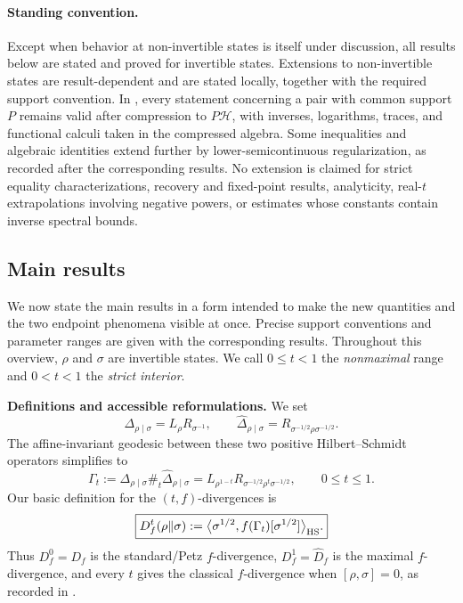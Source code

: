 \documentclass[11pt]{article}
\theoremstyle{remark}
\newcommand{\1}{\mathbbm{1}}
\begin{document}
\paragraph{Standing convention.}
Except when behavior at non-invertible states is itself under
discussion, all results below are stated and proved for invertible
states.  Extensions to non-invertible states are result-dependent and
are stated locally, together with the required support convention.
In , every
statement concerning a pair with common support $P$ remains valid
after compression to $P\mathcal H$, with inverses, logarithms,
traces, and functional calculi taken in the compressed algebra.
Some inequalities and algebraic identities extend further by
lower-semicontinuous regularization, as recorded after the
corresponding results.  No extension is claimed for strict
equality characterizations, recovery and fixed-point results,
analyticity, real-$t$ extrapolations involving negative powers, or
estimates whose constants contain inverse spectral bounds.

\subsection{Main results}
\label{rw:subsec:informal-main-results}

We now state the main results in a form intended to make the new
quantities and the two endpoint phenomena visible at once.  Precise
support conventions and parameter ranges are given with the
corresponding results.  Throughout this overview, $\rho$ and $\sigma$
are invertible states.  We call $0\leq t<1$ the \emph{nonmaximal}
range and $0<t<1$ the \emph{strict interior}.

\medskip
\noindent\textbf{Definitions and accessible reformulations.}
We set
\begin{equation*}
 \Delta_{\rho\mid\sigma}=L_\rho R_{\sigma^{-1}},
 \qquad
 \widehat\Delta_{\rho\mid\sigma}
 =R_{\sigma^{-1/2}\rho\sigma^{-1/2}}.
\end{equation*}
The affine-invariant geodesic between these two positive
Hilbert--Schmidt operators simplifies to
\begin{equation*}
 \Gamma_t
 :=\Delta_{\rho\mid\sigma}\#_t
   \widehat\Delta_{\rho\mid\sigma}
 =L_{\rho^{1-t}}
  R_{\sigma^{-1/2}\rho^t\sigma^{-1/2}},
 \qquad 0\leq t\leq1.
\end{equation*}
Our basic definition for the $(t,f)$-divergences is
\begin{equation}
 \boxed{
 D_f^t(\rho\Vert\sigma)
 :=\big\langle\sigma^{1/2},
 f(\Gamma_t)[\sigma^{1/2}]\big\rangle_{\rm HS}.}
 \label{rw:eq:intro-Dft}
\end{equation}
Thus $D_f^0=D_f$ is the standard/Petz $f$-divergence,
$D_f^1=\widehat D_f$ is the maximal $f$-divergence, and every $t$
gives the classical $f$-divergence when $[\rho,\sigma]=0$, as recorded
in .
\end{document}
